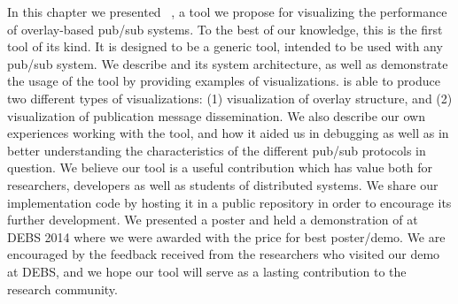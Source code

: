 In this chapter we presented \demo{}~\cite{korsveien2014vizpub}, a tool
we propose for visualizing the performance of overlay-based pub/sub
systems. To the best of our knowledge, this is the first tool of its
kind. It is designed to be a generic tool, intended to be used with any
pub/sub system. We describe \demo{} and its system architecture, as well
as demonstrate the usage of the tool by providing examples of
visualizations. \demo{} is able to produce two different types of
visualizations: (1) visualization of overlay structure, and (2)
visualization of publication message dissemination.  We also describe
our own experiences working with the tool, and how it aided us in
debugging as well as in better understanding the characteristics of the
different pub/sub protocols in question. We believe our tool is a useful
contribution which has value both for researchers, developers as well as
students of distributed systems. We share our implementation code by
hosting it in a public repository in order to encourage its further
development. We presented a poster and held a demonstration of \demo{}
at DEBS 2014 where we were awarded with the price for best poster/demo.
We are encouraged by the feedback received from the researchers who
visited our demo at DEBS, and we hope our tool will serve as a lasting
contribution to the research community.

